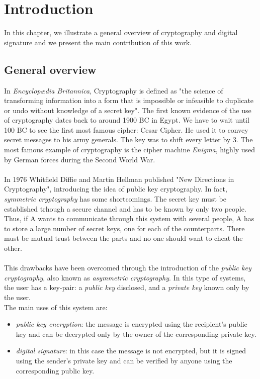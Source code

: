 \chapter{Introduction}
\label{Introduzione}

In this chapter, we illustrate a general overview of cryptography and digital signature and we present the main contribution of this work.
\section{General overview}
In \textit{Encyclop\ae dia Britannica\cite{EnBrit}}, Cryptography is defined as "the science of transforming information into a form that is impossible or infeasible to duplicate or undo without knowledge of a secret key". The first known evidence of the use of cryptography dates back to around 1900 BC in Egypt. We have to wait until 100 BC to see the first most famous cipher: Cesar Cipher. He used it to convey secret messages to his army generals. The key was to shift every letter by 3. The most famous example of cryptography is the cipher machine \textit{Enigma}, highly used by German forces during the Second World War.\\
\\
In 1976 Whitfield Diffie and Martin Hellman published "New Directions in Cryptography", introducing the idea of
public key cryptography. In fact, \textit{symmetric cryptography} has some shortcomings. The  secret key must be established trhough a secure channel and has to be known by only two people. Thus, if A wants to communicate through this system with several people, A has to store a large number of secret keys, one for each of the counterparts. There must be mutual trust between the parts and no one should want to cheat the other.\\
\\
This drawbacks have been overcomed through the introduction of the \textit{public key cryptography}, also known as \textit{asymmetric cryptography}. In this type of systems, the user has a key-pair: a \textit{public key} disclosed, and a \textit{private key} known only by the user. \\
The main uses of this system are:
\begin{itemize}
	\item \textit{public key encryption}: the message is encrypted using the recipient's public key and can be decrypted only by the owner of the corresponding private key.
	\item \textit{digital signature}: in this case the message is not encrypted, but it is signed using the sender's private key and can be verified by anyone using the corresponding public key.
\end{itemize} 
